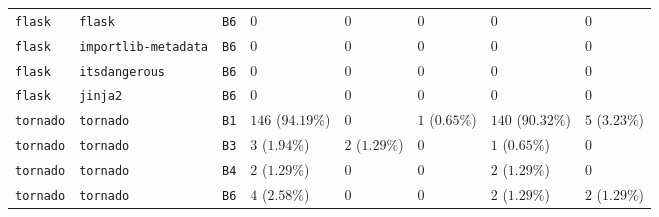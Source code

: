 \begin{table}
\begin{tabular}{llllllll}
\texttt{flask} & \texttt{flask} & \texttt{B6} & $0$ & $0$ & $0$ & $0$ & $0$ \\
\texttt{flask} & \texttt{importlib-metadata} & \texttt{B6} & $0$ & $0$ & $0$ & $0$ & $0$ \\
\texttt{flask} & \texttt{itsdangerous} & \texttt{B6} & $0$ & $0$ & $0$ & $0$ & $0$ \\
\texttt{flask} & \texttt{jinja2} & \texttt{B6} & $0$ & $0$ & $0$ & $0$ & $0$ \\
\texttt{tornado} & \texttt{tornado} & \texttt{B1} & $146$ ($94.19\%$) & $0$ & $1$ ($0.65\%$) & $140$ ($90.32\%$) & $5$ ($3.23\%$) \\
\texttt{tornado} & \texttt{tornado} & \texttt{B3} & $3$ ($1.94\%$) & $2$ ($1.29\%$) & $0$ & $1$ ($0.65\%$) & $0$ \\
\texttt{tornado} & \texttt{tornado} & \texttt{B4} & $2$ ($1.29\%$) & $0$ & $0$ & $2$ ($1.29\%$) & $0$ \\
\texttt{tornado} & \texttt{tornado} & \texttt{B6} & $4$ ($2.58\%$) & $0$ & $0$ & $2$ ($1.29\%$) & $2$ ($1.29\%$) \\
\bottomrule
\end{tabular}
\end{table}
